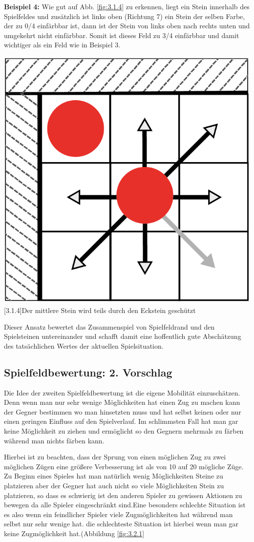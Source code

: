 \documentclass[12pt,a4paper,bibliography=totocnumbered,listof=totocnumbered]{scrartcl}
\begin{document}
    \textbf{Beispiel 4:} Wie gut auf Abb. \ref{fig:3.1.4} zu erkennen, liegt ein Stein innerhalb des Spielfeldes und zusätzlich ist links oben (Richtung 7) ein Stein der selben Farbe, der zu 0/4 einfärbbar ist, dann ist der Stein von links oben nach rechts unten und umgekehrt nicht einfärbbar. Somit ist dieses Feld zu 3/4 einfärbbar und damit wichtiger als ein Feld wie in Beispiel 3.\newline

   	\vspace{1em}
    \begin{minipage}{\linewidth}
    	\centering
    	\includegraphics[width=0.33\linewidth]{pics/Kapitel_3/Kapitel_3_pic4.png}
    	[3.1.4]{Der mittlere Stein wird teils durch den Eckstein geschützt}
    	\label{fig:3.1.4}
    \end{minipage}
	\vspace{1em}
	
	Dieser Ansatz bewertet das Zusammenspiel von Spielfeldrand und den Spielsteinen untereinander und schafft damit eine hoffentlich gute Abschätzung des tatsächlichen Wertes der aktuellen Spielsituation.

    \subsection{Spielfeldbewertung: 2. Vorschlag}

    Die Idee der zweiten Spielfeldbewertung ist die eigene Mobilität einzuschätzen. Denn wenn man nur sehr wenige Möglichkeiten hat einen Zug zu machen kann der Gegner bestimmen wo man hinsetzten muss und hat selbst keinen oder nur einen geringen Einfluss auf den Spielverlauf. Im schlimmsten Fall hat man gar keine Möglichkeit zu ziehen und ermöglicht so den Gegnern mehrmals zu färben während man nichts färben kann.

    
    \vspace{1em}
    
    
    Hierbei ist zu beachten, dass der Sprung von einen möglichen Zug zu zwei möglichen Zügen eine größere Verbesserung ist als von 10 auf 20 mögliche Züge.
    Zu Beginn eines Spieles hat man natürlich wenig Möglichkeiten Steine zu platzieren aber der Gegner hat auch nicht so viele Möglichkeiten Stein zu platzieren, so dass es schwierig ist den anderen Spieler zu gewissen Aktionen zu bewegen da alle Spieler eingeschränkt sind.Eine besonders schlechte Situation ist es also wenn ein feindlicher Spieler viele Zugmöglichkeiten hat während man selbst nur sehr wenige hat.
    die schlechteste Situation ist hierbei wenn man gar keine Zugmöglichkeit hat.(Abbildung \ref{fig:3.2.1} 
    
\end{document}
